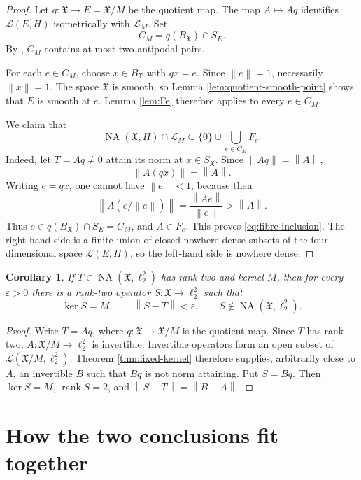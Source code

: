 \documentclass[11pt]{article}
\newtheorem{corollary}[theorem]{Corollary}
\theoremstyle{definition}
\newcommand{\NA}{\operatorname{NA}}
\newcommand{\calL}{\mathcal L}
\newcommand{\rank}{\operatorname{rank}}
\newcommand{\X}{\mathfrak X}
\newcommand{\norm}[1]{\left\lVert #1\right\rVert}
\begin{document}
\begin{proof}
Let \(q:\X\to E=\X/M\) be the quotient map.  The map
\(A\mapsto Aq\) identifies \(\calL(E,H)\) isometrically with \(\calL_M\).
Set
\[
                 C_M=q(B_\X)\cap S_E.
\]
By \cite[Proposition 6(b)]{Martin2025}, \(C_M\) contains at most two
antipodal pairs.

For each \(e\in C_M\), choose \(x\in B_\X\) with \(qx=e\).  Since
\(\norm{e}=1\), necessarily \(\norm{x}=1\).  The space \(\X\) is smooth, so
Lemma \ref{lem:quotient-smooth-point} shows that \(E\) is smooth at \(e\).
Lemma \ref{lem:Fe} therefore applies to every \(e\in C_M\).

We claim that
\begin{equation}\label{eq:fibre-inclusion}
 \NA(\X,H)\cap\calL_M
 \subseteq
 \{0\}\cup\bigcup_{e\in C_M}F_e.
\end{equation}
Indeed, let \(T=Aq\neq0\) attain its norm at \(x\in S_\X\).  Since
\(\norm{Aq}=\norm{A}\),
\[
                \norm{A(qx)}=\norm{A}.
\]
Writing \(e=qx\), one cannot have \(\norm{e}<1\), because then
\[
       \norm{A(e/\norm{e})}
       =\frac{\norm{Ae}}{\norm{e}}
       >\norm{A}.
\]
Thus \(e\in q(B_\X)\cap S_E=C_M\), and \(A\in F_e\).  This proves
\eqref{eq:fibre-inclusion}.  The right-hand side is a finite union of closed
nowhere dense subsets of the four-dimensional space \(\calL(E,H)\), so the
left-hand side is nowhere dense.
\end{proof}

\begin{corollary}\label{cor:fixed-kernel}
If \(T\in\NA(\X,\ell_2^2)\) has rank two and kernel \(M\), then for every
\(\varepsilon>0\) there is a rank-two operator
\(S:\X\to\ell_2^2\) such that
\[
       \ker S=M,\qquad \norm{S-T}<\varepsilon,
       \qquad S\notin\NA(\X,\ell_2^2).
\]
\end{corollary}

\begin{proof}
Write \(T=Aq\), where \(q:\X\to\X/M\) is the quotient map.  Since \(T\)
has rank two, \(A:\X/M\to\ell_2^2\) is invertible.  Invertible operators form
an open subset of \(\calL(\X/M,\ell_2^2)\).  Theorem
\ref{thm:fixed-kernel} therefore supplies, arbitrarily close to \(A\), an
invertible \(B\) such that \(Bq\) is not norm attaining.  Put \(S=Bq\).
Then \(\ker S=M\), \(\rank S=2\), and
\(\norm{S-T}=\norm{B-A}\).
\end{proof}

\section{How the two conclusions fit together}
\end{document}
